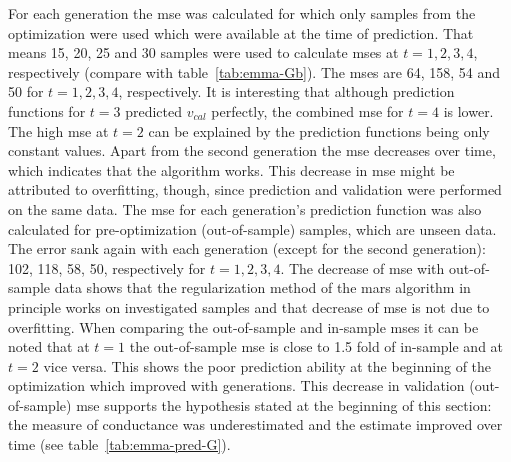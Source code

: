 For each generation the \gls{mse} was calculated for which only samples 
from the optimization were used which were available at the time of prediction. 
That means 15, 20, 25 and 30 samples 
were used to calculate \gls{mse}s at $t=1,2,3,4$, respectively (compare with table~\ref{tab:emma-Gb}).
The \gls{mse}s are 64, 158, 54 and 50 for $t=1,2,3,4$, respectively. 
It is interesting that although prediction functions for $t=3$ predicted $v_{cal}$ perfectly, the combined \gls{mse} for $t=4$ is lower. 
The high \gls{mse} at $t=2$ can be explained by the prediction functions being only constant values. 
Apart from the second generation the \gls{mse} decreases  over time, 
which indicates that the algorithm works. 
This decrease in \gls{mse} might be attributed to overfitting, though, since prediction and validation were performed on the same data. 
The \gls{mse} for each generation's prediction function was also calculated for pre-optimization (out-of-sample) samples, which are unseen data. 
The error sank again with each generation (except for the second generation): 102, 118, 58, 50, respectively for $t=1,2,3,4$. 
The decrease of \gls{mse} with out-of-sample data shows that the regularization method 
of the \gls{mars} algorithm in principle works on investigated samples and that decrease of \gls{mse} is not due to overfitting. 
%
When comparing the out-of-sample and in-sample \gls{mse}s it can be noted that at $t=1$ the out-of-sample \gls{mse} is close to 1.5 fold of in-sample and at $t=2$ vice versa.
This shows the poor prediction ability at the beginning of the optimization which improved with generations.
This decrease in validation (out-of-sample) \gls{mse} supports the hypothesis stated at the beginning of this section: 
the measure of conductance was underestimated and the estimate improved over time (see table~\ref{tab:emma-pred-G}).

